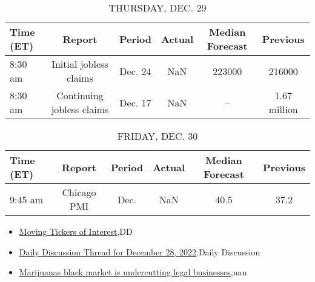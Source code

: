 \documentclass{article}%
\begin{document}
%


\begin{table}[htbp]%
\caption{THURSDAY, DEC. 29}%
\centering%
\begin{adjustbox}{width=1\textwidth}%
\begin{tabular}{lccccc}
\toprule
Time (ET) &                    Report &  Period & Actual & Median Forecast &     Previous \\
\midrule
  8:30 am &    Initial jobless claims & Dec. 24 &    NaN &          223000 &       216000 \\
  8:30 am & Continuing jobless claims & Dec. 17 &    NaN &              -- & 1.67 million \\
\bottomrule
\end{tabular}
%
\end{adjustbox}%
\end{table}

%


\begin{table}[htbp]%
\caption{FRIDAY, DEC. 30}%
\centering%
\begin{adjustbox}{width=1\textwidth}%
\begin{tabular}{lccccc}
\toprule
Time (ET) &      Report & Period & Actual & Median Forecast & Previous \\
\midrule
  9:45 am & Chicago PMI &   Dec. &    NaN &            40.5 &     37.2 \\
\bottomrule
\end{tabular}
%
\end{adjustbox}%
\end{table}

%
\begin{itemize}%
\item%
\href{https://reddit.com/r/wallstreetbets/comments/zx8rls/moving\_tickers\_of\_interest/}{Moving Tickers of Interest},DD%
\item%
\href{https://reddit.com/r/wallstreetbets/comments/zx6thz/daily\_discussion\_thread\_for\_december\_28\_2022/}{Daily Discussion Thread for December 28, 2022},Daily Discussion%
\item%
\href{https://reddit.com/r/Economics/comments/zx2ut8/marijuanas\_black\_market\_is\_undercutting\_legal/}{Marijuanas black market is undercutting legal businesses},nan%
\end{itemize}%
\end{document}
